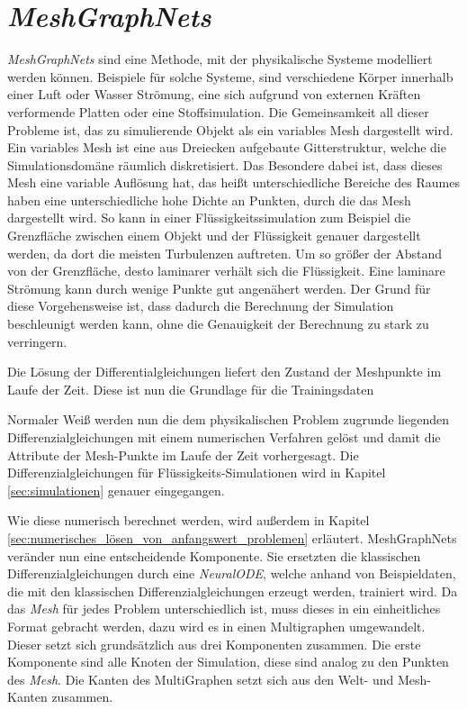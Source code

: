 

\section{\textit{MeshGraphNets}} \label{sec:meshgraphnets}

\textit{MeshGraphNets} \cite{meshgraphnets} sind eine Methode, mit der physikalische Systeme modelliert werden können.
Beispiele für solche Systeme, sind verschiedene Körper innerhalb einer Luft oder Wasser Strömung, eine 
sich aufgrund von externen Kräften verformende Platten oder eine Stoffsimulation.
Die Gemeinsamkeit all dieser Probleme ist, das zu simulierende Objekt als ein variables Mesh dargestellt wird.
Ein variables Mesh ist eine aus Dreiecken aufgebaute Gitterstruktur, welche die Simulationsdomäne räumlich diskretisiert.
Das Besondere dabei ist, dass dieses Mesh eine variable Auflösung hat, das heißt unterschiedliche Bereiche des Raumes 
haben eine unterschiedliche hohe Dichte an Punkten, durch die das Mesh dargestellt wird.
So kann in einer Flüssigkeitssimulation zum Beispiel die Grenzfläche zwischen einem Objekt und der Flüssigkeit
genauer dargestellt werden, da dort die meisten Turbulenzen auftreten.
Um so größer der Abstand von der Grenzfläche, desto laminarer verhält sich die Flüssigkeit.
Eine laminare Strömung kann durch wenige Punkte gut angenähert werden.
Der Grund für diese Vorgehensweise ist, dass dadurch die Berechnung der Simulation beschleunigt werden kann,
ohne die Genauigkeit der Berechnung zu stark zu verringern.

Die Lösung der Differentialgleichungen liefert den Zustand der Meshpunkte im Laufe der Zeit.
Diese ist nun die Grundlage für die Trainingsdaten 

Normaler Weiß werden nun die dem physikalischen Problem zugrunde liegenden Differenzialgleichungen mit einem numerischen Verfahren gelöst 
und damit die Attribute der Mesh-Punkte im Laufe der Zeit vorhergesagt.
Die Differenzialgleichungen für Flüssigkeits-Simulationen wird in Kapitel \ref{sec:simulationen} genauer eingegangen.


Wie diese numerisch berechnet werden, wird außerdem in Kapitel \ref{sec:numerisches_lösen_von_anfangswert_problemen} erläutert.
MeshGraphNets veränder nun eine entscheidende Komponente.
Sie ersetzten die klassischen Differenzialgleichungen durch eine \textit{NeuralODE},
welche anhand von Beispieldaten, die mit den klassischen Differenzialgleichungen erzeugt werden, trainiert wird.
Da das \textit{Mesh} für jedes Problem unterschiedlich ist, muss dieses in ein einheitliches Format gebracht werden, dazu wird es in einen
Multigraphen umgewandelt.
Dieser setzt sich grundsätzlich aus drei Komponenten zusammen.
Die erste Komponente sind alle Knoten der Simulation, diese sind analog zu den Punkten des \textit{Mesh}.
Die Kanten des MultiGraphen setzt sich aus den Welt- und Mesh-Kanten zusammen.

